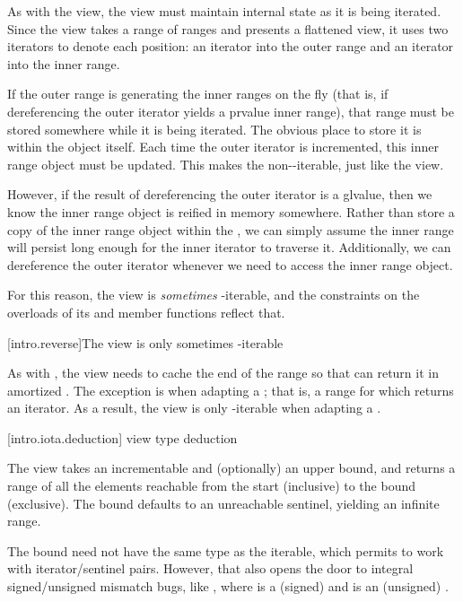 \pnum
As with the  view, the  view must maintain internal
state as it is being iterated. Since the  view takes a range of
ranges and presents a flattened view, it uses two iterators to denote each
position: an iterator into the outer range and an iterator into the inner range.

\pnum
If the outer range is generating the inner ranges on the fly (that is, if
dereferencing the outer iterator yields a prvalue inner range), that range must
be stored somewhere while it is being iterated. The obvious place to store it
is within the  object itself. Each time the outer iterator is
incremented, this inner range object must be updated. This makes the
 non--iterable, just like the  view.

\pnum
However, if the result of dereferencing the outer iterator is a glvalue, then
we know the inner range object is reified in memory somewhere. Rather than store
a copy of the inner range object within the , we can simply
assume the inner range will persist long enough for the inner iterator to
traverse it. Additionally, we can dereference the outer iterator whenever we
need to access the inner range object.

\pnum
For this reason, the  view is \textit{sometimes}
-iterable, and the constraints on the  overloads of
its  and  member functions reflect that.

[intro.reverse]{The  view is only sometimes -iterable}

\pnum
As with , the  view needs to cache the end of the
range so that  can return it in amortized . The exception
is when adapting a ; that is, a range for which 
returns an iterator. As a result, the  view is only
-iterable when adapting a .

[intro.iota.deduction]{ view type deduction}

\pnum
The  view takes an incrementable and (optionally) an upper bound,
and returns a range of all the elements reachable from the start (inclusive) to
the bound (exclusive). The bound defaults to an unreachable sentinel, yielding
an infinite range.

\pnum
The bound need not have the same type as the iterable, which permits 
to work with iterator/sentinel pairs. However, that also opens the door to
integral signed/unsigned mismatch bugs, like ,
where  is a (signed)  and  is an (unsigned)
.

